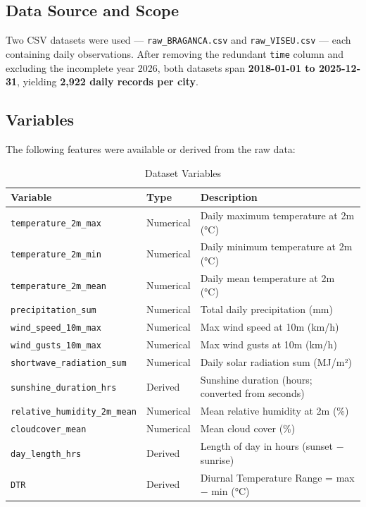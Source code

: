 \documentclass[11pt,a4paper]{article}
\begin{document}
\subsection{Data Source and Scope}

Two CSV datasets were used — \texttt{raw\_BRAGANCA.csv} and \texttt{raw\_VISEU.csv} — each containing daily observations. After removing the redundant \texttt{time} column and excluding the incomplete year 2026, both datasets span \textbf{2018-01-01 to 2025-12-31}, yielding \textbf{2,922 daily records per city}.

\newpage

\subsection{Variables}

The following features were available or derived from the raw data:

\begin{table}[H]
\centering
\caption{Dataset Variables}
\begin{tabular}{lll}
\toprule
\textbf{Variable} & \textbf{Type} & \textbf{Description} \\
\midrule
\texttt{temperature\_2m\_max} & Numerical & Daily maximum temperature at 2m (°C) \\
\texttt{temperature\_2m\_min} & Numerical & Daily minimum temperature at 2m (°C) \\
\texttt{temperature\_2m\_mean} & Numerical & Daily mean temperature at 2m (°C) \\
\texttt{precipitation\_sum} & Numerical & Total daily precipitation (mm) \\
\texttt{wind\_speed\_10m\_max} & Numerical & Max wind speed at 10m (km/h) \\
\texttt{wind\_gusts\_10m\_max} & Numerical & Max wind gusts at 10m (km/h) \\
\texttt{shortwave\_radiation\_sum} & Numerical & Daily solar radiation sum (MJ/m²) \\
\texttt{sunshine\_duration\_hrs} & Derived & Sunshine duration (hours; converted from seconds) \\
\texttt{relative\_humidity\_2m\_mean} & Numerical & Mean relative humidity at 2m (\%) \\
\texttt{cloudcover\_mean} & Numerical & Mean cloud cover (\%) \\
\texttt{day\_length\_hrs} & Derived & Length of day in hours (sunset $-$ sunrise) \\
\texttt{DTR} & Derived & Diurnal Temperature Range = max $-$ min (°C) \\
\bottomrule
\end{tabular}
\end{table}
\end{document}
